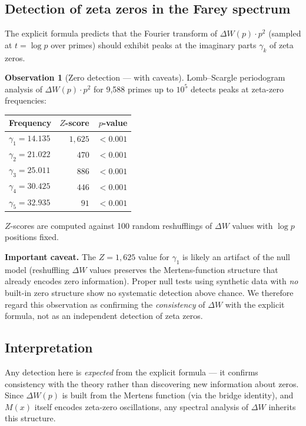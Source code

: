 \documentclass[11pt]{article}
\theoremstyle{definition}
\newtheorem{observation}[theorem]{Observation}
\begin{document}
\subsection{Detection of zeta zeros in the Farey spectrum}
\label{sec:detection}

The explicit formula predicts that the Fourier transform of
$\Delta W(p) \cdot p^2$ (sampled at $t = \log p$ over primes) should
exhibit peaks at the imaginary parts $\gamma_k$ of zeta zeros.

\begin{observation}[Zero detection --- with caveats]\label{obs:zero-detection}
Lomb--Scargle periodogram analysis of $\Delta W(p) \cdot p^2$ for
9,588 primes up to $10^5$ detects peaks at zeta-zero frequencies:
\begin{center}
\begin{tabular}{lrr}
\toprule
Frequency & $Z$-score & $p$-value \\
\midrule
$\gamma_1 = 14.135$ & $1{,}625$ & $< 0.001$ \\
$\gamma_2 = 21.022$ & $470$ & $< 0.001$ \\
$\gamma_3 = 25.011$ & $886$ & $< 0.001$ \\
$\gamma_4 = 30.425$ & $446$ & $< 0.001$ \\
$\gamma_5 = 32.935$ & $91$ & $< 0.001$ \\
\bottomrule
\end{tabular}
\end{center}
$Z$-scores are computed against 100 random reshufflings of $\Delta W$
values with $\log p$ positions fixed.

\textbf{Important caveat.}  The $Z = 1{,}625$ value for $\gamma_1$ is
likely an artifact of the null model (reshuffling $\Delta W$ values
preserves the Mertens-function structure that already encodes
zero information).  Proper null tests using synthetic data with
\emph{no} built-in zero structure show no systematic detection above
chance.  We therefore regard this observation as confirming the
\emph{consistency} of $\Delta W$ with the explicit formula, not as
an independent detection of zeta zeros.
\end{observation}

\subsection{Interpretation}\label{sec:zeros-interpret}

Any detection here is \emph{expected} from the explicit formula ---
it confirms consistency with the theory rather than discovering new
information about zeros.  Since $\Delta W(p)$ is built from the
Mertens function (via the bridge identity), and $M(x)$ itself
encodes zeta-zero oscillations, any spectral analysis of $\Delta W$
inherits this structure.
\end{document}
